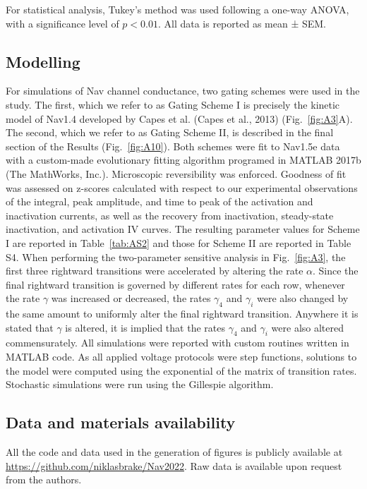 For statistical analysis, Tukey’s method was used following a one-way ANOVA, with a significance level of $p<0.01$. All data is reported as mean ± SEM. 

\subsection{Modelling}
For simulations of Nav channel conductance, two gating schemes were used in the study. The first, which we refer to as Gating Scheme I is precisely the kinetic model of Nav1.4 developed by Capes et al. (Capes et al., 2013) (Fig.~\ref{fig:A3}A). The second, which we refer to as Gating Scheme II, is described in the final section of the Results (Fig.~\ref{fig:A10}). Both schemes were fit to Nav1.5e data with a custom-made evolutionary fitting algorithm programed in MATLAB 2017b (The MathWorks, Inc.). Microscopic reversibility was enforced. Goodness of fit was assessed on z-scores calculated with respect to our experimental observations of the integral, peak amplitude, and time to peak of the activation and inactivation currents, as well as the recovery from inactivation, steady-state inactivation, and activation IV curves. The resulting parameter values for Scheme I are reported in Table~\ref{tab:AS2} and those for Scheme II are reported in Table S4.
When performing the two-parameter sensitive analysis in Fig.~\ref{fig:A3}, the first three rightward transitions were accelerated by altering the rate $\alpha$. Since the final rightward transition is governed by different rates for each row, whenever the rate $\gamma$ was increased or decreased, the rates $\gamma_4$ and $\gamma_i$ were also changed by the same amount to uniformly alter the final rightward transition. Anywhere it is stated that $\gamma$ is altered, it is implied that the rates $\gamma_4$ and $\gamma_i$ were also altered commensurately.
All simulations were reported with custom routines written in MATLAB code. As all applied voltage protocols were step functions, solutions to the model were computed using the exponential of the matrix of transition rates. Stochastic simulations were run using the Gillespie algorithm. 	

\subsection{Data and materials availability}
All the code and data used in the generation of figures is publicly available at \url{https://github.com/niklasbrake/Nav2022}. Raw data is available upon request from the authors.

